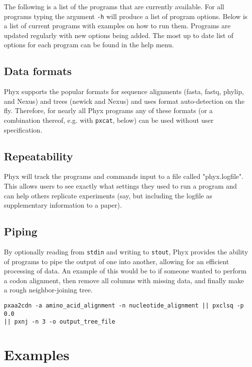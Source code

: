 \documentclass[12pt,letterpaper]{memoir}
\begin{document}
The following is a list of the programs that are currently available. For all programs typing the argument \texttt{-h} will produce a list of program options. Below is a list of current programs with examples on how to run them. Programs are updated regularly with new options being added. The most up to date list of options for each program can be found in the help menu.

\subsection{Data formats}

Phyx supports the popular formats for sequence alignments (fasta, fastq, phylip, and Nexus) and trees (newick and Nexus) and uses format auto-detection on the fly. Therefore, for nearly all Phyx programs any of these formats (or a combination thereof, e.g. with \texttt{pxcat}, below) can be used without user specification.


\subsection{Repeatability}

Phyx will track the programs and commands input to a file called "phyx.logfile". This allows users to see exactly what settings they used to run a program and can help others replicate experiments (say, but including the logfile as supplementary information to a paper).

\subsection{Piping}

By optionally reading from \texttt{stdin} and writing to \texttt{stout}, Phyx provides the ability of programs to pipe the output of one into another, allowing for an efficient processing of data. An example of this would be to if someone wanted to perform a codon alignment, then remove all columns with missing data, and finally make a rough neighbor-joining tree.
\begin{flushleft}
\begin{verbatim}
pxaa2cdn -a amino_acid_alignment -n nucleotide_alignment || pxclsq -p 0.0 
|| pxnj -n 3 -o output_tree_file
\end{verbatim}
\end{flushleft}

\section{Examples}
\end{document}
